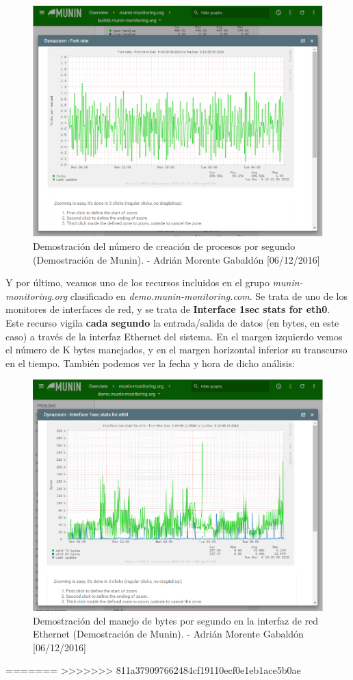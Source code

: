 \begin{figure}[H]
	\centering
	\includegraphics[scale=0.3]{munin-forkrate}
	\caption{Demostración del número de creación de procesos por segundo (Demostración de Munin). - Adrián Morente Gabaldón [06/12/2016]}
	\label{figura5}
\end{figure}
Y por último, veamos uno de los recursos incluidos en el grupo \emph{munin-monitoring.org} clasificado en \emph{demo.munin-monitoring.com}. Se trata de uno de los monitores de interfaces de red, y se trata de \textbf{Interface 1sec stats for eth0}. Este recurso vigila \textbf{cada segundo} la entrada/salida de datos (en bytes, en este caso) a través de la interfaz Ethernet del sistema. En el margen izquierdo vemos el número de K bytes manejados, y en el margen horizontal inferior su transcurso en el tiempo. También podemos ver la fecha y hora de dicho análisis:
\begin{figure}[H]
	\centering
	\includegraphics[scale=0.3]{munin-network}
	\caption{Demostración del manejo de bytes por segundo en la interfaz de red Ethernet (Demostración de Munin). - Adrián Morente Gabaldón [06/12/2016]}
	\label{figura6}
\end{figure}
=======
>>>>>>> 811a379097662484cf19110ecf0e1eb1ace5b0ae

